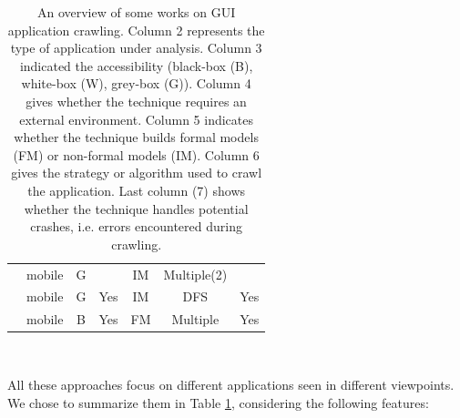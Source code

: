 \begin{table}
\begin{tabular}{| c | c | c | c | c | c | c |}
		\cite{WPX13}                            &mobile                 &G  &  &IM &Multiple(2)		& 	\\

		\cite{Azim13}                           &mobile                 &G	&Yes &IM &DFS		& Yes \\

		\cite{SP15}								&mobile                 &B	&Yes &FM &Multiple		& Yes \\
		\hline
	\end{tabular}
	\\

	\caption{An overview of some works on GUI application
	crawling. Column 2 represents the type of application under
	analysis. Column 3 indicated the accessibility (black-box
	(B), white-box (W), grey-box (G)). Column 4 gives whether the
	technique requires an external environment. Column 5
	indicates whether the technique builds formal models (FM) or
	non-formal models (IM). Column 6 gives the strategy or
	algorithm used to crawl the application. Last column (7)
	shows whether the technique handles potential crashes, i.e.
	errors encountered during crawling.}
	\label{table:gui_works}
\end{table}

All these approaches focus on different applications seen in
different viewpoints. We chose to summarize them in Table
\ref{table:gui_works}, considering the following features:

